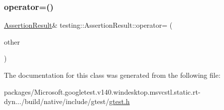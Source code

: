 \mbox{\label{classtesting_1_1_assertion_result_aad9274c7b69eda67eb9306963a790839}} 
\subsubsection{\texorpdfstring{operator=()}{operator=()}}
{\footnotesize\ttfamily \mbox{\hyperlink{classtesting_1_1_assertion_result}{Assertion\+Result}}\& testing\+::\+Assertion\+Result\+::operator= (\begin{DoxyParamCaption}\item[{\mbox{\hyperlink{classtesting_1_1_assertion_result}{Assertion\+Result}}}]{other }\end{DoxyParamCaption})\hspace{0.3cm}{\ttfamily [inline]}}



The documentation for this class was generated from the following file\+:\begin{DoxyCompactItemize}
\item 
packages/\+Microsoft.\+googletest.\+v140.\+windesktop.\+msvcstl.\+static.\+rt-\/dyn.../build/native/include/gtest/\mbox{\hyperlink{gtest_8h}{gtest.\+h}}\end{DoxyCompactItemize}
